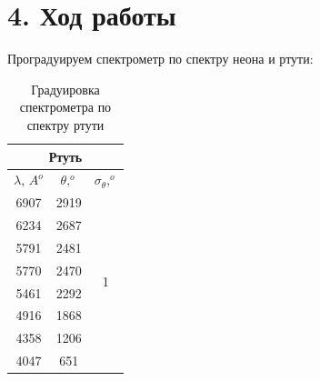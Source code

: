 \documentclass[a4paper,12pt]{report}
\begin{document}
\section*{4. Ход работы}
Проградуируем спектрометр по спектру неона и ртути:

\begin{table}[H]
\begin{tabular}{|ccc|}
\hline
\multicolumn{3}{|c|}{Ртуть}                                                    \\ \hline
\multicolumn{1}{|c|}{$\lambda$, $A^{o}$} & \multicolumn{1}{c|}{$\theta, ^{o}$} & $\sigma_{\theta}, ^{o}$        \\ \hline
\multicolumn{1}{|c|}{6907}   & \multicolumn{1}{c|}{2919}  & \multirow{8}{*}{1} \\ \cline{1-2}
\multicolumn{1}{|c|}{6234}   & \multicolumn{1}{c|}{2687}  &                    \\ \cline{1-2}
\multicolumn{1}{|c|}{5791}   & \multicolumn{1}{c|}{2481}  &                    \\ \cline{1-2}
\multicolumn{1}{|c|}{5770}   & \multicolumn{1}{c|}{2470}  &                    \\ \cline{1-2}
\multicolumn{1}{|c|}{5461}   & \multicolumn{1}{c|}{2292}  &                    \\ \cline{1-2}
\multicolumn{1}{|c|}{4916}   & \multicolumn{1}{c|}{1868}  &                    \\ \cline{1-2}
\multicolumn{1}{|c|}{4358}   & \multicolumn{1}{c|}{1206}  &                    \\ \cline{1-2}
\multicolumn{1}{|c|}{4047}   & \multicolumn{1}{c|}{651}   &                    \\ \hline
\end{tabular}
\caption{Градуировка спектрометра по спектру ртути}
\end{table}
\end{document}

